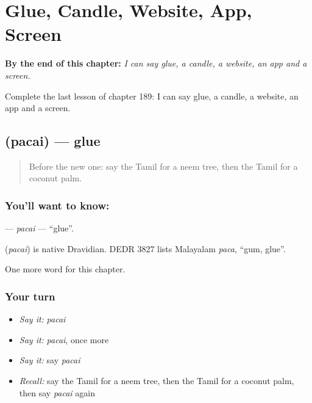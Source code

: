 
\chapter{Glue, Candle, Website, App, Screen}
\label{ch:ta-glue-candle-website-app-screen}

\begin{chapteropening}
\textbf{By the end of this chapter:} \emph{I can say glue, a candle, a website, an app and a screen.}

Complete the last lesson of chapter 189: I can say glue, a candle, a website, an app and a screen.
\end{chapteropening}

\section[\texorpdfstring{\ta{பசை} (pacai)}{பசை (pacai)}]{ (pacai) — glue}

\label{lesson:TA-C189-pacai}



\begin{quote}
Before the new one: say the Tamil for a neem tree, then the Tamil for a coconut palm.
\end{quote}

\subsection*{You'll want to know: }
\textbf{} — \emph{pacai} — \textquotedblleft{}glue\textquotedblright{}.

\begin{cousinweb}
\textbf{} (\emph{pacai}) is native Dravidian. DEDR 3827 lists Malayalam \emph{paca}, \textquotedblleft{}gum, glue\textquotedblright{}.
\end{cousinweb}

\begin{grammarlens}[title={What you've built}]
One more word for this chapter.
\end{grammarlens}

\subsection*{Your turn}
\begin{itemize}
\raggedright
  \item \emph{Say it:} \emph{pacai}
  \item \emph{Say it:} \emph{pacai}, once more
  \item \emph{Say it:} say \emph{pacai}
  \item \emph{Recall:} say the Tamil for a neem tree, then the Tamil for a coconut palm, then say \emph{pacai} again
\end{itemize}

